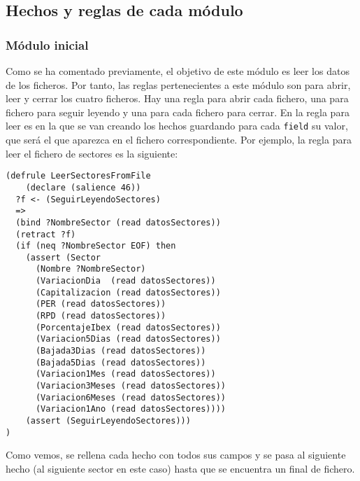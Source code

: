 \documentclass[12pt]{article}
\begin{document}
\subsection{Hechos y reglas de cada módulo}
\subsubsection{Módulo inicial}
Como se ha comentado previamente, el objetivo de este módulo es leer los datos de los ficheros. Por tanto, las reglas pertenecientes a este módulo son para abrir, leer y cerrar los cuatro ficheros. Hay una regla para abrir cada fichero, una para fichero para seguir leyendo y una para cada fichero para cerrar. En la regla para leer es en la que se van creando los hechos guardando para cada \texttt{field} su valor, que será el que aparezca en el fichero correspondiente. Por ejemplo, la regla para leer el fichero de sectores es la siguiente:

\begin{lstlisting}
(defrule LeerSectoresFromFile
	(declare (salience 46))
  ?f <- (SeguirLeyendoSectores)
  =>
  (bind ?NombreSector (read datosSectores))
  (retract ?f)
  (if (neq ?NombreSector EOF) then
    (assert (Sector
      (Nombre ?NombreSector)
      (VariacionDia  (read datosSectores))
      (Capitalizacion (read datosSectores))
      (PER (read datosSectores))
      (RPD (read datosSectores))
      (PorcentajeIbex (read datosSectores))
      (Variacion5Dias (read datosSectores))
      (Bajada3Dias (read datosSectores))
      (Bajada5Dias (read datosSectores))
      (Variacion1Mes (read datosSectores))
      (Variacion3Meses (read datosSectores))
      (Variacion6Meses (read datosSectores))
      (Variacion1Ano (read datosSectores))))
    (assert (SeguirLeyendoSectores)))
)
\end{lstlisting}

Como vemos, se rellena cada hecho con todos sus campos y se pasa al siguiente hecho (al siguiente sector en este caso) hasta que se encuentra un final de fichero.
\end{document}
